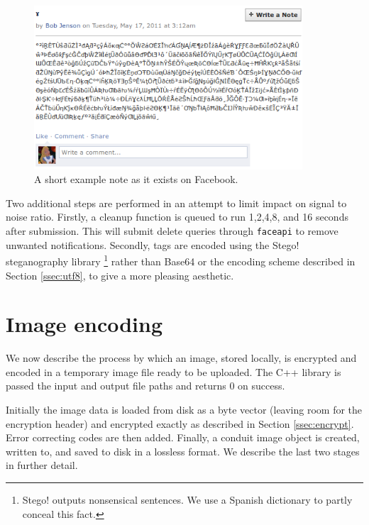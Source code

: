    \begin{figure}[tbph]
        \begin{center}
                \includegraphics[width=10cm]{screens/note.png}
            \caption{A short example note as it exists on Facebook.}
            \label{scn:note}
        \end{center}
    \end{figure}

Two additional steps are performed in an attempt to limit impact on signal to noise ratio. Firstly, a cleanup function is queued to run 1,2,4,8, and 16 seconds after submission. This will submit delete queries through {\tt faceapi} to remove unwanted notifications. Secondly, tags are encoded using the Stego! steganography library \footnote{Stego! outputs nonsensical sentences. We use a Spanish dictionary to partly conceal this fact.} rather than Base64 or the encoding scheme described in Section \ref{ssec:utf8}, to give a more pleasing aesthetic.


\FloatBarrier
\section{Image encoding}
\label{sec:img-sub}

We now describe the process by which an image, stored locally, is encrypted and encoded in a temporary image file ready to be uploaded. The C++ library is passed the input and output file paths and returns 0 on success.

Initially the image data is loaded from disk as a byte vector (leaving room for the encryption header) and encrypted exactly as described in Section \ref{ssec:encrypt}. Error correcting codes are then added. Finally, a conduit image object is created, written to, and saved to disk in a lossless format. We describe the last two stages in further detail.

